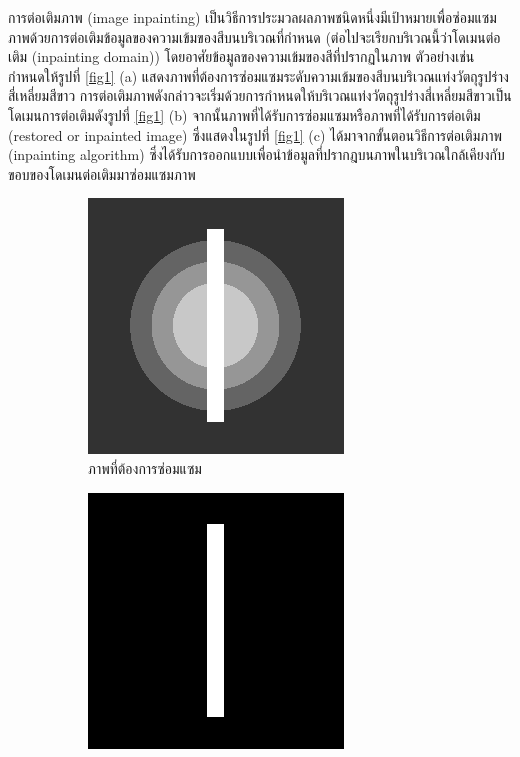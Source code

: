 \documentclass[hidelinks, a4paper,12pt]{article}
\numberwithin{equation}{section}							%
\numberwithin{equation}{section}
\begin{document}
{	\hspace{1cm} การต่อเติมภาพ (image inpainting) เป็นวิธีการประมวลผลภาพชนิดหนึ่งมีเป้าหมายเพื่อซ่อมแซมภาพด้วยการต่อเติมข้อมูลของความเข้มของสีบนบริเวณที่กำหนด (ต่อไปจะเรียกบริเวณนี้ว่าโดเมนต่อเติม (inpainting domain)) โดยอาศัยข้อมูลของความเข้มของสีที่ปรากฏในภาพ ตัวอย่างเช่น 
	กำหนดให้รูปที่ \ref{fig1} (a) แสดงภาพที่ต้องการซ่อมแซมระดับความเข้มของสีบนบริเวณแท่งวัตถุรูปร่างสี่เหลี่ยมสีขาว การต่อเติมภาพดังกล่าวจะเริ่มด้วยการกำหนดให้บริเวณแท่งวัตถุรูปร่างสี่เหลี่ยมสีขาวเป็นโดเมนการต่อเติมดังรูปที่ \ref{fig1} (b) จากนั้นภาพที่ได้รับการซ่อมแซมหรือภาพที่ได้รับการต่อเติม (restored or inpainted image) ซึ่งแสดงในรูปที่ \ref{fig1} (c) ได้มาจากขั้นตอนวิธีการต่อเติมภาพ (inpainting algorithm) ซึ่งได้รับการออกแบบเพื่อนำข้อมูลที่ปรากฎบนภาพในบริเวณใกล้เคียงกับขอบของโดเมนต่อเติมมาซ่อมแซมภาพ 
	
	\begin{figure}[H]
		\centering
		\begin{subfigure}{0.3\linewidth}
			\centering
			\includegraphics[width=0.8\linewidth]{images/grayscale_inpaint/toinpaint.png}
			\caption{ภาพที่ต้องการซ่อมแซม}
		\end{subfigure}
		\begin{subfigure}{0.3\linewidth}
			\centering
			\includegraphics[width=0.8\linewidth]{images/grayscale_inpaint/inpaintdomain.png}

\end{subfigure}
\end{figure}}
\end{document}
